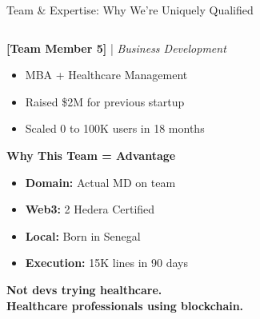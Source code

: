 \documentclass[aspectratio=169,xcolor=dvipsnames,14pt]{beamer}
\newcommand{\checkitem}{\item[\color{SuccessGreen}\faCheckCircle]}
\begin{document}
\begin{frame}{Team \& Expertise: Why We're Uniquely Qualified}
\begin{columns}[T]
\begin{column}{0.5\textwidth}
      \vspace{0.2cm}

      \textbf{[Team Member 5]} | \textit{Business Development}
      \begin{itemize}
        \item MBA + Healthcare Management
        \item Raised \$2M for previous startup
        \item Scaled 0 to 100K users in 18 months
      \end{itemize}

      \vspace{0.3cm}

      \textbf{\textcolor{HederaPurple}{Why This Team = Advantage}}

      \begin{itemize}
        \checkitem \textbf{Domain:} Actual MD on team
        \checkitem \textbf{Web3:} 2 Hedera Certified
        \checkitem \textbf{Local:} Born in Senegal
        \checkitem \textbf{Execution:} 15K lines in 90 days
      \end{itemize}

      \vspace{0.2cm}

      \begin{center}
        \textbf{Not devs trying healthcare.} \\
        \textbf{Healthcare professionals using blockchain.}
      \end{center}
    \end{column}
  \end{columns}

\end{frame}
\end{document}
